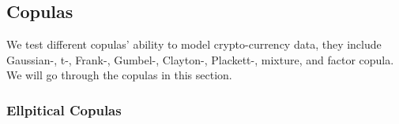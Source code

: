 
\subsection{Copulas}
We test different copulas' ability to model crypto-currency data,
they include Gaussian-, t-, Frank-, Gumbel-, Clayton-, Plackett-, mixture, and factor copula.
We will go through the copulas in this section.

%
%

\subsubsection{Ellpitical Copulas}\label{sec:ellpitical-copulas}
%
%
%
%


